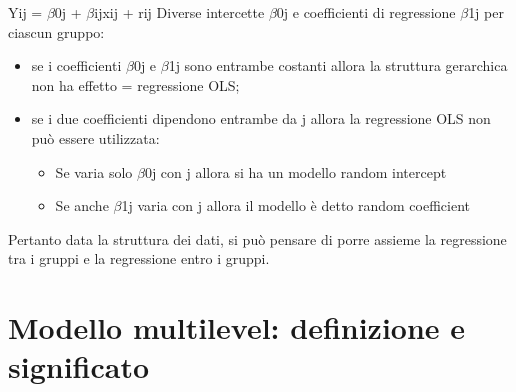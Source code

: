 \documentclass[a4page, 11pt]{article} %
\begin{document}
\newline
Yij = $\beta$0j + $\beta$ijxij + rij
\newline
Diverse intercette $\beta$0j e coefficienti di regressione $\beta$1j per ciascun gruppo:
\begin{itemize}	
\item se i coefficienti $\beta$0j e $\beta$1j sono entrambe costanti allora la struttura
gerarchica non ha effetto = regressione OLS;
\item se i due coefficienti dipendono entrambe da j allora la regressione OLS
non può essere utilizzata:
	\begin{itemize}
	\item Se varia solo $\beta$0j con j allora si ha un modello random intercept
 	\item Se anche $\beta$1j varia con j allora il modello è detto random coefficient
	\end{itemize}
\end{itemize}
Pertanto data la struttura dei dati, si può pensare di porre assieme la regressione tra i gruppi e la regressione entro i gruppi.


\section{Modello multilevel: definizione e significato}
\end{document}
